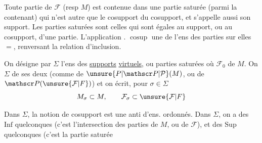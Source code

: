 
Toute partie de $\mathcal F$ (resp $M$) est contenue dans une partie saturée  (parmi  la contenant) qui  n'est autre que le cosupport du cosupport, et s'appelle aussi son support. Les parties saturées sont celles qui sont égales au support, ou au cosupport, d'une partie. L'application . $\operatorname{cosup}$  une  de l'ens des parties  sur elles $=$, renversant la relation d'inclusion.

On désigne par $\Sigma$ l'ens des \uline{supports} \uline{virtuels}, ou parties saturées
où  $\mathcal F_0$ de $M$.   On  $\Sigma$ de  ses deux  (comme  de $\unsure{P|\mathscr P|\mathcal P}(M)$, ou de $\mathscr P(\unsure{\mathcal F|F})$) et on écrit, pour $\sigma\in\Sigma$
\[
M_\sigma\subset M,\qquad\mathcal F_\sigma\subset\unsure{\mathcal F|F}
\]

Dans $\Sigma$,  la notion de cosupport est une anti d'ens. ordonnés. Dans $\Sigma$, on a des $\mathrm{Inf}$ quelconques (c'est l'intersection des parties de $M$, ou de $\mathcal F$), et des $\mathrm{Sup}$ quelconques (c'est la partie saturée
